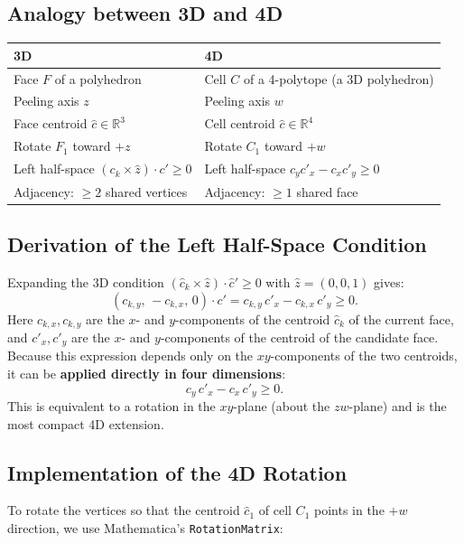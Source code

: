 \documentclass[12pt,a4paper]{article}
\theoremstyle{definition}
\begin{document}
\subsection{Analogy between 3D and 4D}

\begin{center}
\begin{tabular}{ll}
\toprule
3D & 4D \\
\midrule
Face $F$ of a polyhedron & Cell $C$ of a 4-polytope (a 3D polyhedron) \\
Peeling axis $z$ & Peeling axis $w$ \\
Face centroid $\hat{c} \in \mathbb{R}^3$ & Cell centroid $\hat{c} \in \mathbb{R}^4$ \\
Rotate $F_1$ toward $+z$ & Rotate $C_1$ toward $+w$ \\
Left half-space $(c_k \times \hat{z}) \cdot c' \geq 0$ &
  Left half-space $c_y c'_x - c_x c'_y \geq 0$ \\
Adjacency: $\geq 2$ shared vertices & Adjacency: $\geq 1$ shared face \\
\bottomrule
\end{tabular}
\end{center}

\subsection{Derivation of the Left Half-Space Condition}

Expanding the 3D condition $(\hat{c}_k \times \hat{z}) \cdot \hat{c}' \geq 0$
with $\hat{z} = (0,0,1)$ gives:
\[
  (c_{k,y},\, -c_{k,x},\, 0) \cdot c' = c_{k,y}\,c'_x - c_{k,x}\,c'_y \geq 0.
\]
Here $c_{k,x}, c_{k,y}$ are the $x$- and $y$-components of the centroid
$\hat{c}_k$ of the current face, and $c'_x, c'_y$ are the $x$- and
$y$-components of the centroid of the candidate face.
Because this expression depends only on the $xy$-components of the two
centroids, it can be \textbf{applied directly in four dimensions}:
\[
  \boxed{c_y\,c'_x - c_x\,c'_y \geq 0}.
\]
This is equivalent to a rotation in the $xy$-plane (about the $zw$-plane)
and is the most compact 4D extension.

\subsection{Implementation of the 4D Rotation}

To rotate the vertices so that the centroid $\hat{c}_1$ of cell $C_1$ points
in the $+w$ direction, we use Mathematica's \texttt{RotationMatrix}:
\end{document}
